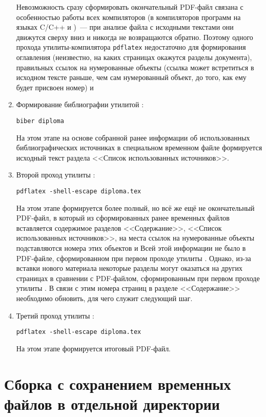 \documentclass[a4paper, 14pt, reqno, oneside]{extbook}
\begin{document}
\begin{enumerate}
    Невозможность сразу сформировать окончательный PDF-файл связана с особенностью работы всех компиляторов (в \tch компиляторов программ на языках C/C++ и \dr)~--- при анализе файла с исходными текстами они движутся сверху вниз и никогда не возвращаются обратно. Поэтому одного прохода утилиты-компилятора \texttt{pdflatex} недостаточно для формирования оглавления (\tk неизвестно, на каких страницах окажутся разделы документа), правильных ссылок на нумерованные объекты (\tk ссылка может встретиться в исходном тексте раньше, чем сам нумерованный объект, \te до того, как ему будет присвоен номер) и \td
\item Формирование библиографии утилитой \verb@biber@:
\begin{verbatim}
biber diploma
\end{verbatim}
    На этом этапе на основе собранной ранее информации об использованных библиографических источниках в специальном временном файле формируется исходный текст раздела <<Список использованных источников>>.
\item Второй проход утилиты \verb@pdflatex@:
\begin{verbatim}
pdflatex -shell-escape diploma.tex
\end{verbatim}
    На этом этапе формируется более полный, но всё же ещё не окончательный PDF-файл, в который из сформированных ранее временных файлов вставляется содержимое разделов <<Содержание>>, <<Список использованных источников>>, на места ссылок на нумерованные объекты подставляются номера этих объектов и \td Всей этой информации не было в PDF-файле, сформированном при первом проходе утилиты \verb@pdflatex@. Однако, из-за вставки нового материала некоторые разделы могут оказаться на других страницах в сравнении с PDF-файлом, сформированным при первом проходе утилиты \verb@pdflatex@. В связи с этим номера страниц в разделе <<Содержание>> необходимо обновить, для чего служит следующий шаг.
\item Третий проход утилиты \verb@pdflatex@:
\begin{verbatim}
pdflatex -shell-escape diploma.tex
\end{verbatim}
    На этом этапе формируется итоговый PDF-файл.
\end{enumerate}

\section{Сборка с сохранением временных файлов в отдельной директории}
\label{sec:build dir}
\end{document}
